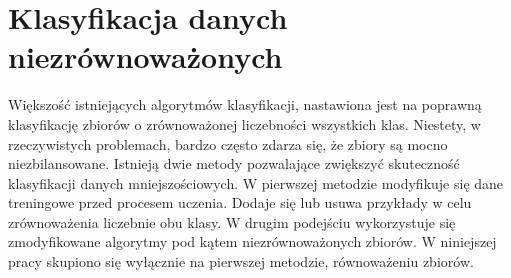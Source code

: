 \chapter{Klasyfikacja danych niezrównoważonych}
Większość istniejących algorytmów klasyfikacji, nastawiona jest na poprawną klasyfikację zbiorów o zrównoważonej liczebności wszystkich klas. Niestety, w rzeczywistych problemach, bardzo często zdarza się, że zbiory są mocno niezbilansowane. Istnieją dwie metody pozwalające zwiększyć skuteczność klasyfikacji danych mniejszościowych. W pierwszej metodzie modyfikuje się dane treningowe przed procesem uczenia. Dodaje się lub usuwa przykłady w celu zrównoważenia liczebnie obu klasy. W drugim podejściu wykorzystuje się zmodyfikowane algorytmy pod kątem niezrównoważonych zbiorów. W niniejszej pracy skupiono się wyłącznie na pierwszej metodzie, równoważeniu zbiorów.	
